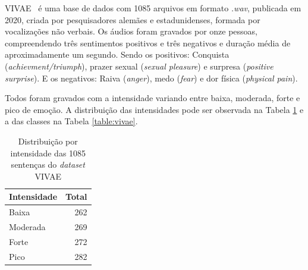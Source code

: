 \acrlong{VIVAE}~\cite{16} é uma base de dados com 1085 arquivos em formato \textit{.wav}, publicada em 2020, criada por pesquisadores alemães e estadunidenses, formada por vocalizações não verbais. Os áudios foram gravados por onze pessoas, compreendendo três sentimentos positivos e três negativos e duração média de aproximadamente um segundo. Sendo os positivos: Conquista (\textit{achievment/triumph}), prazer sexual (\textit{sexual pleasure}) e surpresa (\textit{positive surprise}). E os negativos: Raiva (\textit{anger}), medo (\textit{fear}) e dor física (\textit{physical pain}).

Todos foram gravados com a intensidade variando entre baixa, moderada, forte e pico de emoção. A distribuição das intensidades pode ser observada na Tabela \ref{table:vivaeintensidade} e a das classes na Tabela \ref{table:vivae}.

\begin{table}[]
    \centering
    \caption{Distribuição por intensidade das 1085 sentenças do \textit{dataset} VIVAE}
    \begin{tabular}{|l|r|}
    \hline
        Intensidade & Total  \\ \hline
        Baixa & 262  \\ \hline
        Moderada & 269  \\ \hline
        Forte & 272  \\ \hline
        Pico & 282  \\ \hline
    \end{tabular}\label{table:vivaeintensidade}
\end{table}


